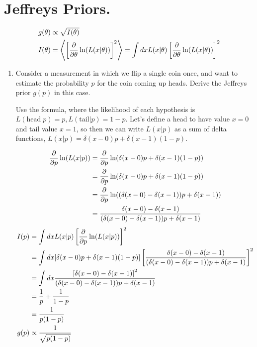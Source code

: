 \section{Jeffreys Priors.}

\begin{align*}
    g(\theta) &\propto \sqrt{I(\theta)}\\
    I(\theta) &= \left< \left[\frac{\partial}{\partial\theta} \ln(L(x|\theta))\right]^2 \right> = \int dx L(x|\theta) \left[\frac{\partial}{\partial\theta} \ln(L(x|\theta))\right]^2\\
\end{align*}

\begin{enumerate}[label=\textbf{\Alph*}.]
    \item Consider a measurement in which we flip a single coin once, and want to estimate the probability $p$ for the coin coming up heads. Derive the Jeffreys prior $g(p)$ in this case.

    Use the formula, where the likelihood of each hypothesis is $L(\text{head}|p) = p, L(\text{tail}|p) = 1-p$. Let's define a head to have value $x=0$ and tail value $x=1$, so then we can write $L(x|p)$ as a sum of delta functions, $L(x|p) = \delta(x-0)p + \delta(x-1)(1-p)$.

    \begin{align*}
        \frac{\partial}{\partial p} \ln(L(x|p)) &= \frac{\partial}{\partial p} \ln(\delta(x-0)p + \delta(x-1)(1-p)) \\
        &= \frac{\partial}{\partial p} \ln(\delta(x-0)p + \delta(x-1)(1-p)) \\
        &= \frac{\partial}{\partial p} \ln((\delta(x-0) - \delta(x-1))p + \delta(x-1)) \\
        &= \frac{\delta(x-0) - \delta(x-1)}{(\delta(x-0) - \delta(x-1))p + \delta(x-1)} \\
    \end{align*}
    \begin{align*}
        I(p) &= \int dx L(x|p) \left[\frac{\partial}{\partial p} \ln(L(x|p))\right]^2\\
        &= \int dx [\delta(x-0)p + \delta(x-1)(1-p)] \left[\frac{\delta(x-0) - \delta(x-1)}{(\delta(x-0) - \delta(x-1))p + \delta(x-1)}\right]^2\\
        &= \int dx \frac{\left[\delta(x-0) - \delta(x-1)\right]^2}{(\delta(x-0) - \delta(x-1))p + \delta(x-1)}\\
        &= \frac{1}{p} + \frac{1}{1-p}\\
        &= \frac{1}{p(1-p)}\\
        g(p) &\propto \frac{1}{\sqrt{p(1-p)}} \\
    \end{align*}


\end{enumerate}
